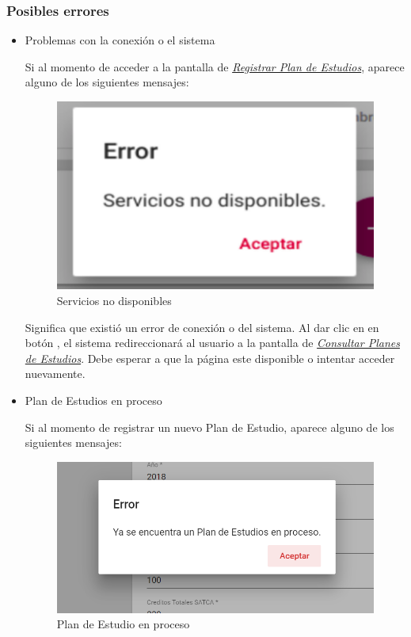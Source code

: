 \subsubsection{Posibles errores}
\begin{itemize}
	
	\item Problemas con la conexión o el sistema
	
	Si al momento de acceder a la pantalla de \hyperlink{registrarPE}{\textit{Registrar Plan de Estudios}}, aparece alguno de los siguientes mensajes:
		\begin{figure}[!hbtp]
		\centering
		\hypertarget{error}{\includegraphics[width=0.7\linewidth]{images/SP4-GPE/error}}
		\caption{Servicios no disponibles}
		\label{error}
		\end{figure}
	
	
	Significa que existió un error de conexión o del sistema. Al dar clic en en botón , el sistema redireccionará al usuario a la pantalla de \hyperlink{consultarPE}{\textit{Consultar Planes de Estudios}}. Debe esperar a que la página este disponible o intentar acceder nuevamente.
	\newpage
	\item Plan de Estudios en proceso
	
	Si al momento de registrar un nuevo Plan de Estudio, aparece alguno de los siguientes mensajes:
	\begin{figure}[!hbtp]
		\centering
		\hypertarget{error1}{\includegraphics[width=0.7\linewidth]{images/SP4-GPE/error1}}
		\caption{Plan de Estudio en proceso}
		\label{error1}
	\end{figure}
	

\end{itemize}
